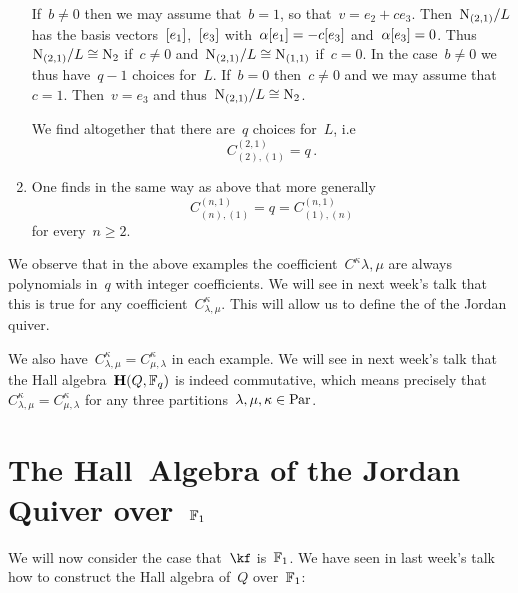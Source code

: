 \documentclass[a4paper,11pt]{scrartcl}
\begin{document}
\begin{example}
\begin{enumerate}
      If~$b \neq 0$ then we may assume that~$b = 1$, so that~$v = e_2 + c e_3$.
      Then~$\mathrm{N}_{(2,1)}/L$ has the basis vectors~$[e_1]$,~$[e_3]$ with~$\alpha [e_1] = - c [e_3]$ and~$\alpha [e_3] = 0$.
      Thus~$\mathrm{N}_{(2,1)}/L \cong \mathrm{N}_2$ if~$c \neq 0$ and~$\mathrm{N}_{(2,1)}/L \cong \mathrm{N}_{(1,1)}$ if~$c = 0$.
      In the case~$b \neq 0$ we thus have~$q - 1$ choices for~$L$.
%
      If~$b = 0$ then~$c \neq 0$ and we may assume that~$c = 1$.
      Then~$v = e_3$ and thus~$\mathrm{N}_{(2,1)}/L \cong \mathrm{N}_2$.

      We find altogether that there are~$q$ choices for~$L$, i.e
      \[
        C^{(2,1)}_{(2),(1)}
        =
        q \,.
      \]
    \item
      One finds in the same way as above that more generally
      \[
        C^{(n, 1)}_{(n), (1)}
        =
        q
        =
        C^{(n, 1)}_{(1), (n)}
      \]
      for every~$n \geq 2$.
  \end{enumerate}
  We observe that in the above examples the coefficient~$C^{\kappa}{\lambda, \mu}$ are always polynomials in~$q$ with integer coefficients.
  We will see in next week’s talk that this is true for any coefficient~$C^{\kappa}_{\lambda, \mu}$.
  This will allow us to define the  of the Jordan quiver.

  We also have~$C^{\kappa}_{\lambda, \mu} = C^{\kappa}_{\mu, \lambda}$ in each example.
  We will see in next week’s talk that the Hall algebra~$\mathbf{H}(Q, \mathbb{F}_q)$ is indeed commutative, which means precisely that~$C^\kappa_{\lambda, \mu} = C^\kappa_{\mu, \lambda}$ for any three partitions~$\lambda, \mu, \kappa \in \mathrm{Par}$.
\end{example}





\section{The Hall~Algebra of the Jordan Quiver over~$\mathbb{F}_1$}

We will now consider the case that~$\kf$ is~$\mathbb{F}_1$.
We have seen in last week’s talk how to construct the Hall algebra of~$Q$ over~$\mathbb{F}_1$:
\end{document}
